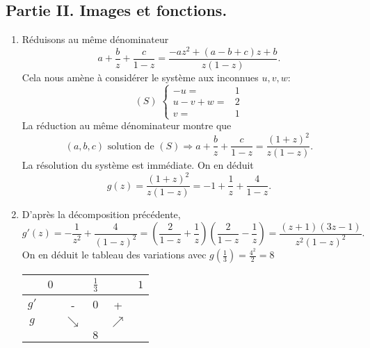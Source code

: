 \subsection*{Partie II. Images et fonctions.}
\begin{enumerate}
 \item Réduisons au même dénominateur
\[
 a+\frac{b}{z}+\frac{c}{1-z} = \frac{-az^2+(a-b+c)z+b}{z(1-z)}.
\]
Cela nous amène à considérer le système aux inconnues $u,v,w$:
\[
 (S) \;
 \left\lbrace 
\begin{aligned}
 -u =& 1 \\
 u -v + w =& 2 \\
 v =& 1
\end{aligned}
\right.  
\]
La réduction au même dénominateur montre que 
\[
 (a,b,c) \text{ solution de } (S) \Rightarrow a+\frac{b}{z}+\frac{c}{1-z} = \frac{(1+z)^2}{z(1-z)}.
\]
La résolution du système est immédiate. On en déduit
\[
 g(z) = \frac{(1+z)^2}{z(1-z)} = -1 + \frac{1}{z} + \frac{4}{1-z}.
\]

 \item D'après la décomposition précédente,
\[
 g'(z) = -\frac{1}{z^2} + \frac{4}{(1-z)^2} = \left(\frac{2}{1-z} + \frac{1}{z} \right) \left(\frac{2}{1-z} - \frac{1}{z} \right)
 = \frac{(z+1)(3z-1)}{z^2(1-z)^2}.
\]
On en déduit le tableau des variations avec $g(\frac{1}{3})=\frac{4^2}{2} = 8$
\begin{center}
\renewcommand{\arraystretch}{1.5}
\begin{tabular}{|c|ccccc|}\hline
     & $0$ &            & $\frac{1}{3}$ &            & $1$\\ \hline
$g'$ &     & -          & $0$           & +          & \\ \hline
$g$  &     & $\searrow$ &               & $\nearrow$ & \\
     &     &            & $8$           &            & \\ \hline
\end{tabular}
\end{center}


\end{enumerate}
